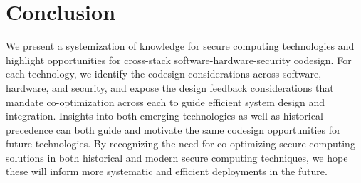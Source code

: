 \section{Conclusion}

We present a systemization of knowledge for secure computing technologies and highlight opportunities for cross-stack software-hardware-security codesign.
For each technology, we identify the codesign considerations across software, hardware, and security, and expose the design feedback considerations that mandate co-optimization across each to guide efficient system design and integration.
Insights into both emerging technologies as well as historical precedence can both guide and motivate the same codesign opportunities for future technologies.
By recognizing the need for co-optimizing secure computing solutions in both historical and modern secure computing techniques, we hope these will inform more systematic and efficient deployments in the future.
